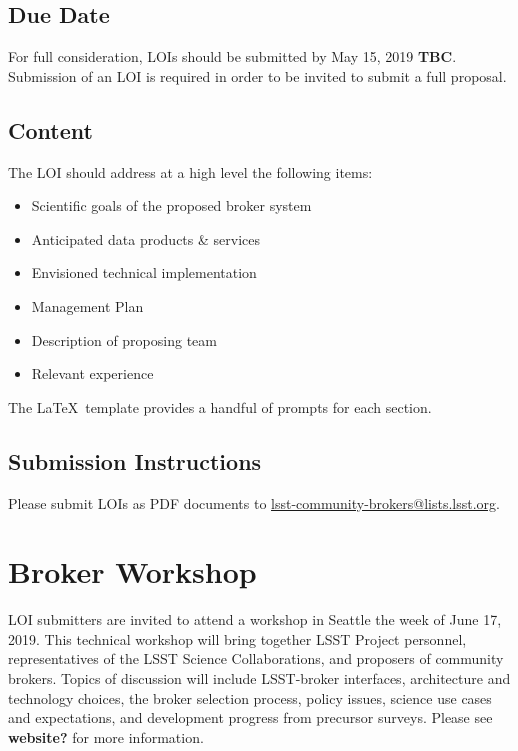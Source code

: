 \documentclass[DM,toc,lsstdraft]{lsstdoc}
\begin{document}
\subsection{Due Date}

For full consideration, LOIs should be submitted by May 15, 2019 \textbf{TBC}.
Submission of an LOI is required in order to be invited to submit a full proposal.

\subsection{Content}

The LOI should address at a high level the following items:

\begin{itemize}
	\item Scientific goals of the proposed broker system
	\item Anticipated data products \& services
	\item Envisioned technical implementation
	\item Management Plan
	\item Description of proposing team
	\item Relevant experience 
\end{itemize}

The \LaTeX\ template provides a handful of prompts for each section.

\subsection{Submission Instructions}

Please submit LOIs as PDF documents to \url{lsst-community-brokers@lists.lsst.org}.

\section{Broker Workshop}


LOI submitters are invited to attend a workshop in Seattle the week of June 17, 2019.
This technical workshop will bring together LSST Project personnel, representatives of the LSST Science Collaborations, and proposers of community brokers.  
Topics of discussion will include LSST-broker interfaces, architecture and technology choices, the broker selection process, policy issues, science use cases and expectations, and development progress from precursor surveys.
Please see \textbf{website?} for more information.
\end{document}
